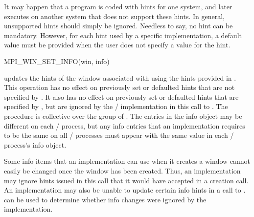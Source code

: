 \begin{implementors}
It may happen that a program is coded with hints for one system, and
later executes on another system that does not support these hints.
In general, unsupported hints should simply be ignored.
Needless to say, no hint can be mandatory.
However, for each hint used by a specific implementation,
a default value must be provided
when the user does not specify a value for
the hint. 
\end{implementors}

%
%
\begin{funcdef}{MPI\_WIN\_SET\_INFO}{(\mbox{win}, \mbox{info})}
\end{funcdef}

 updates the hints of the window
associated with  using the hints provided in .
This operation has no effect on previously set or defaulted hints that
are not specified by .  It also has no effect on previously
set or defaulted hints that are specified by , but are
ignored by the \MPI/ implementation in this call to
.
The procedure is collective over the group of .
The entries in the info object may be different on each \mpi/ process,
but any info entries that an implementation requires to be the same on all \mpi/ processes
must appear with the same value in each \mpi/ process's info object.

\begin{users}
Some info items that an implementation can use when it creates a window
cannot easily be changed once the window has been created.
Thus, an implementation may ignore hints issued in this call that it would have accepted in a creation call.
An implementation may also be unable to update certain info hints in a call to .
 can be used to determine whether info
changes were ignored by the implementation.
\end{users}

